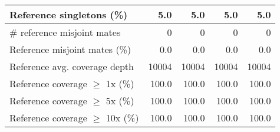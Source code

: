 \documentclass[12pt,a4paper]{article}
\begin{document}
\begin{table}[ht]
\begin{center}
\begin{tabular}{|l*{4}{|r}|}
Reference singletons (\%) & 5.0 & 5.0 & 5.0 & 5.0 \\ \hline
\# reference misjoint mates & 0 & 0 & 0 & 0 \\ \hline
Reference misjoint mates (\%) & 0.0 & 0.0 & 0.0 & 0.0 \\ \hline
Reference avg. coverage depth & 10004 & 10004 & 10004 & 10004 \\ \hline
Reference coverage $\geq$ 1x (\%) & 100.0 & 100.0 & 100.0 & 100.0 \\ \hline
Reference coverage $\geq$ 5x (\%) & 100.0 & 100.0 & 100.0 & 100.0 \\ \hline
Reference coverage $\geq$ 10x (\%) & 100.0 & 100.0 & 100.0 & 100.0 \\ \hline
\end{tabular}
\end{center}
\end{table}
\end{document}
